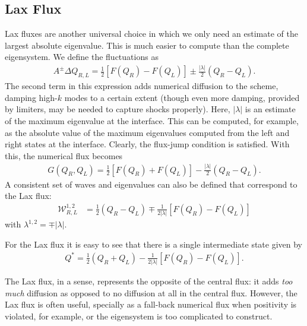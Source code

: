 \documentclass[12pt]{article}
\theoremstyle{definition}
\theoremstyle{definition}
\theoremstyle{definition}
\begin{document}
\subsection{Lax Flux}

Lax fluxes are another universal choice in which we only need an
estimate of the largest absolute eigenvalue. This is much easier to
compute than the complete eigensystem. We define the fluctuations as
\begin{align}
  A^{\pm}\Delta Q_{R,L} = 
  \frac{1}{2} \left[ F(Q_R) - F(Q_L) \right]
  \pm  \frac{| \lambda |}{2} \left( Q_R - Q_L \right).
\end{align}
The second term in this expression adds numerical diffusion to the
scheme, damping high-$k$ modes to a certain extent (though even more
damping, provided by limiters, may be needed to capture shocks
properly). Here, $| \lambda |$ is an estimate of the maximum
eigenvalue at the interface. This can be computed, for example, as the
absolute value of the maximum eigenvalues computed from the left and
right states at the interface. Clearly, the flux-jump condition is
satisfied. With this, the numerical flux becomes
\begin{align}
  G(Q_R, Q_L) = \frac{1}{2} \left[ F(Q_R) + F(Q_L) \right]
  -  \frac{| \lambda |}{2} \left( Q_R - Q_L \right).
\end{align}
A consistent set of waves and eigenvalues can also be defined that
correspond to the Lax flux:
\begin{align}
  \mathcal{W}^{1,2}_{R,L} &= \frac{1}{2} \left( Q_R - Q_L \right) \mp \frac{1}{2 |\lambda |} \left[ F(Q_R) - F(Q_L) \right]
\end{align}
with $\lambda^{1,2} = \mp|\lambda |$.

For the Lax flux it is easy to see that there is a single intermediate
state given by
\begin{align}
  Q^* = \frac{1}{2}\left( Q_R + Q_L\right) - \frac{1}{2 |\lambda |} \left[ F(Q_R) - F(Q_L) \right].
\end{align}

The Lax flux, in a sense, represents the opposite of the central flux:
it adds \emph{too much} diffusion as opposed to no diffusion at all in
the central flux. However, the Lax flux is often useful, specially as
a fall-back numerical flux when positivity is violated, for example,
or the eigensystem is too complicated to construct.
\end{document}

